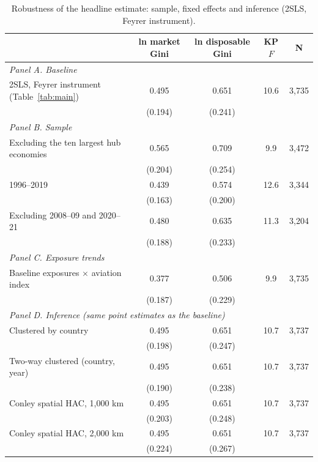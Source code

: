 \begin{table}[H]
\centering
\caption{Robustness of the headline estimate: sample, fixed effects and inference (2SLS, Feyrer instrument).}
\label{tab:robust}
\begin{threeparttable}
\small
\begin{tabular}{lcccc}
\toprule
 & ln market Gini & ln disposable Gini & KP $F$ & N \\
\midrule
\multicolumn{5}{l}{\emph{Panel A. Baseline}}\\
2SLS, Feyrer instrument (Table~\ref{tab:main}) & 0.495\sym{**} & 0.651\sym{***} & 10.6 & 3{,}735 \\
 & (0.194) & (0.241) \\
\multicolumn{5}{l}{\emph{Panel B. Sample}}\\
Excluding the ten largest hub economies & 0.565\sym{***} & 0.709\sym{***} & 9.9 & 3{,}472 \\
 & (0.204) & (0.254) \\
1996--2019 & 0.439\sym{***} & 0.574\sym{***} & 12.6 & 3{,}344 \\
 & (0.163) & (0.200) \\
Excluding 2008--09 and 2020--21 & 0.480\sym{**} & 0.635\sym{***} & 11.3 & 3{,}204 \\
 & (0.188) & (0.233) \\
\multicolumn{5}{l}{\emph{Panel C. Exposure trends}}\\
Baseline exposures $\times$ aviation index & 0.377\sym{**} & 0.506\sym{**} & 9.9 & 3{,}735 \\
 & (0.187) & (0.229) \\
\multicolumn{5}{l}{\emph{Panel D. Inference (same point estimates as the baseline)}}\\
Clustered by country & 0.495\sym{**} & 0.651\sym{***} & 10.7 & 3{,}737 \\
 & (0.198) & (0.247) \\
Two-way clustered (country, year) & 0.495\sym{***} & 0.651\sym{***} & 10.7 & 3{,}737 \\
 & (0.190) & (0.238) \\
Conley spatial HAC, 1{,}000 km & 0.495\sym{**} & 0.651\sym{***} & 10.7 & 3{,}737 \\
 & (0.203) & (0.248) \\
Conley spatial HAC, 2{,}000 km & 0.495\sym{**} & 0.651\sym{**} & 10.7 & 3{,}737 \\
 & (0.224) & (0.267) \\
\bottomrule
\end{tabular}

\end{threeparttable}
\end{table}
